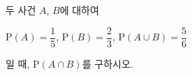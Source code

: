 두 사건 $A$, $B$에 대하여\par\smallskip\noindent\hspace*{1.5em}$\mathrm{P}(A)=\dfrac{1}{5}$, $\mathrm{P}(B)=\dfrac{2}{3}$, $\mathrm{P}(A\cup B)=\dfrac{5}{6}$\par\smallskip\noindent 일 때, $\mathrm{P}(A\cap B)$를 구하시오.

